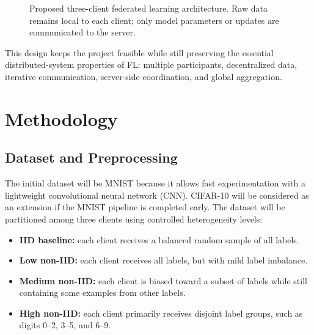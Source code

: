\documentclass[11pt,a4paper]{article}
\begin{document}
\begin{figure}[!ht]
{
}
\caption{Proposed three-client federated learning architecture. Raw data remains local to each client; only model parameters or updates are communicated to the server.}
\label{fig:architecture}
\end{figure}

This design keeps the project feasible while still preserving the essential distributed-system properties of FL: multiple participants, decentralized data, iterative communication, server-side coordination, and global aggregation.

\section{Methodology}

\subsection{Dataset and Preprocessing}

The initial dataset will be MNIST because it allows fast experimentation with a lightweight convolutional neural network (CNN). CIFAR-10 will be considered as an extension if the MNIST pipeline is completed early. The dataset will be partitioned among three clients using controlled heterogeneity levels:

\begin{itemize}
    \item \textbf{IID baseline:} each client receives a balanced random sample of all labels.
    \item \textbf{Low non-IID:} each client receives all labels, but with mild label imbalance.
    \item \textbf{Medium non-IID:} each client is biased toward a subset of labels while still containing some examples from other labels.
    \item \textbf{High non-IID:} each client primarily receives disjoint label groups, such as digits 0--2, 3--5, and 6--9.
\end{itemize}
\end{document}
